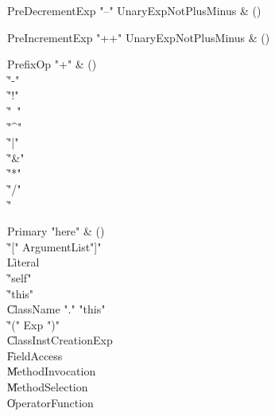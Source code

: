 \begin{bbgrammar}

PreDecrementExp \label{prod:PreDecrementExp}  \: \xcd"--" UnaryExpNotPlusMinus & () \\


\end{bbgrammar}

\begin{bbgrammar}

PreIncrementExp \label{prod:PreIncrementExp}  \: \xcd"++" UnaryExpNotPlusMinus & () \\


\end{bbgrammar}

\begin{bbgrammar}

PrefixOp \label{prod:PrefixOp}  \: \xcd"+" & () \\

    \| \xcd"-" \\
    \| \xcd"!" \\
    \| \xcd"~" \\
    \| \xcd"^" \\
    \| \xcd"|" \\
    \| \xcd"&" \\
    \| \xcd"*" \\
    \| \xcd"/" \\
    \| \xcd"%

\end{bbgrammar}

\begin{bbgrammar}

Primary \label{prod:Primary}  \: \xcd"here" & () \\

    \| \xcd"[" ArgumentList\opt \xcd"]" \\
    \| Literal \\
    \| \xcd"self" \\
    \| \xcd"this" \\
    \| ClassName \xcd"." \xcd"this" \\
    \| \xcd"(" Exp \xcd")" \\
    \| ClassInstCreationExp \\
    \| FieldAccess \\
    \| MethodInvocation \\
    \| MethodSelection \\
    \| OperatorFunction \\

\end{bbgrammar}

